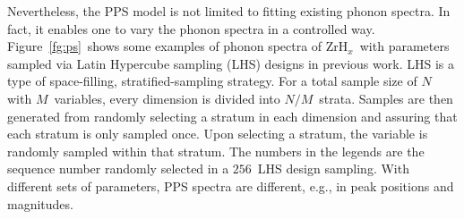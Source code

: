 \documentclass[review]{elsarticle}
\newcommand{\zh}{ZrH$_x$}
\newcommand{\tcb}[1]{{#1}}
\begin{document}
Nevertheless, the PPS model is not limited to fitting existing phonon spectra. In fact, it enables one to vary the phonon spectra in a controlled way. Figure~\ref{fg:ps}~shows some examples of phonon spectra of \zh~with parameters sampled via Latin Hypercube sampling (LHS) designs in previous work\cite{weixiong,thesis,physor}. \tcb{LHS is a type of space-filling, stratified-sampling strategy\cite{lhs}. For a total sample size of $N$ with $M$\ variables, every dimension is divided into $N/M$\ strata. Samples are then generated from randomly selecting a stratum in each dimension and assuring that each stratum is only sampled once. Upon selecting a stratum, the variable is randomly sampled within that stratum}. \tcb{The numbers in the legends are the sequence number randomly selected in a $256$~LHS design sampling. With different sets of parameters, PPS spectra are different, e.g., in peak positions and magnitudes.}

\end{document}
